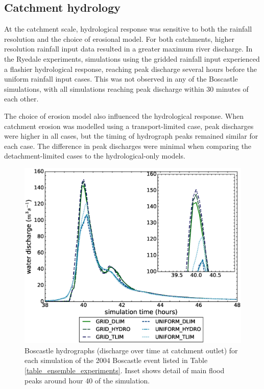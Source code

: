 \subsection{Catchment hydrology}


At the catchment scale, hydrological response was sensitive to both the rainfall resolution and the choice of erosional model. For both catchments, higher resolution rainfall input data resulted in a greater maximum river discharge. In the Ryedale experiments, simulations using the gridded rainfall input experienced a flashier hydrological response, reaching peak discharge several hours before the uniform rainfall input cases. This was not observed in any of the Boscastle simulations, with all simulations reaching peak discharge within 30 minutes of each other.

The choice of erosion model also influenced the hydrological response. When catchment erosion was modelled using a transport-limited case, peak discharges were higher in all cases, but the timing of hydrograph peaks remained similar for each case. The difference in peak discharges were minimal when comparing the detachment-limited cases to the hydrological-only models.

\begin{figure}[t]
\includegraphics[width=14cm]{chp06_figures_scripts/figure_boscastle_hydrograph_ensemble.eps}
\caption{Boscastle hydrographs (discharge over time at catchment outlet) for each simulation of the 2004 Boscastle event listed in Table \ref{table_ensemble_experiments}. Inset shows detail of main flood peaks around hour 40 of the simulation.}
\label{fig_boscastle_hydrograph_ensemble}
\end{figure}

